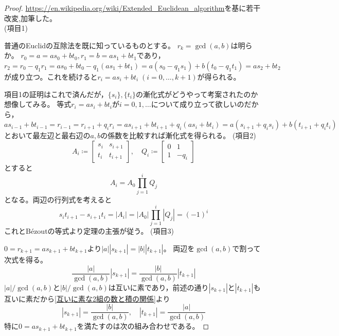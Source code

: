         \begin{proof}
            \url{https://en.wikipedia.org/wiki/Extended_Euclidean_algorithm}を基に若干改変,加筆した。\\
            (項目1)
            \par
            普通のEuclidの互除法を既に知っているものとする。
            $r_k = \gcd(a,b)$は明らか。
            $r_0 = a = as_0 + bt_0,r_1 = b = as_1 + bt_1$であり，$r_2 = r_0 - q_1r_1 = as_0 + bt_0 - q_1(as_1 + bt_1) = a(s_0 - q_1s_1) + b(t_0 - q_1t_1) = as_2 + bt_2$が成り立つ。これを続けると$r_i = as_i + bt_i\;(i=0,\dotsc,k+1)$が得られる。
            \par
            項目1の証明はこれで済んだが，$\{s_i\},\{t_i\}$の漸化式がどうやって考案されたのか想像してみる。
            等式$r_i = as_i + bt_i$が$i=0,1,\dotsc$について成り立って欲しいのだから，$as_{i-1} + bt_{i-1} = r_{i-1} = r_{i+1} + q_ir_i = as_{i+1} + bt_{i+1} + q_i(as_i + bt_i) = a(s_{i+1} + q_is_i) + b(t_{i+1} + q_it_i)$とおいて最左辺と最右辺の$a,b$の係数を比較すれば漸化式を得られる。
            \newline
            (項目2)
            \[
                A_i \coloneq \begin{bmatrix}
                    s_i & s_{i+1} \\
                    t_i & t_{i+1}
                \end{bmatrix},\quad
                Q_i \coloneq \begin{bmatrix}
                    0 & 1 \\
                    1 & -q_i
                \end{bmatrix}
            \]
            とすると
            \[
                A_i = A_0 \prod_{j=1}^i Q_j
            \]
            となる。両辺の行列式を考えると
            \[ s_it_{i+1} - s_{i+1}t_i = |A_i| = |A_0|\prod_{j=1}^i|Q_j| = (-1)^i \]
            これとB\'ezoutの等式より定理の主張が従う。
            \newline
            (項目3)
            \par
            $0 = r_{k+1} = as_{k+1} + bt_{k+1}$より$|a||s_{k+1}| = |b||t_{k+1}|$。
            両辺を$\gcd(a,b)$で割って次式を得る。
            \[ \frac{|a|}{\gcd(a,b)}|s_{k+1}| = \frac{|b|}{\gcd(a,b)}|t_{k+1}| \]
            $|a|/\gcd(a,b)$と$|b|/\gcd(a,b)$は互いに素であり，前述の通り$|s_{k+1}|$と$|t_{k+1}|$も互いに素だから\ref{互いに素な2組の数と積の関係}より
            \[ |s_{k+1}| = \frac{|b|}{\gcd(a,b)},\quad |t_{k+1}| = \frac{|a|}{\gcd(a,b)} \]
            特に$0 = as_{k+1} + bt_{k+1}$を満たすのは次の組み合わせである。

\end{proof}
